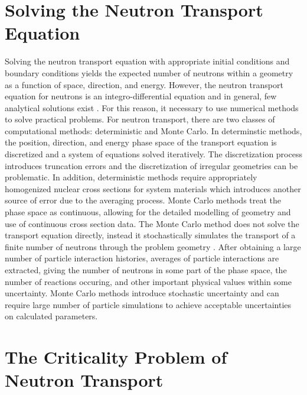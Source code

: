 \section{Solving the Neutron Transport Equation}

Solving the neutron transport equation with appropriate initial conditions and boundary conditions yields the expected number of neutrons within a geometry as a function of space, direction, and energy. However, the neutron transport equation for neutrons is an integro-differential equation and in general, few analytical solutions exist \cite{lewis_computational_1984}. For this reason, it necessary to use numerical methods to solve practical problems. For neutron transport, there are two classes of computational methods: deterministic and Monte Carlo. In determinstic methods, the position, direction, and energy phase space of the transport equation is discretized and a system of equations solved iteratively. The discretization process introduces truncation errors and the discretization of irregular geometries can be problematic. In addition, deterministic methods require appropriately homogenized nuclear cross sections for system materials which introduces another source of error due to the averaging process. Monte Carlo methods treat the phase space as continuous, allowing for the detailed modelling of geometry and use of continuous cross section data. The Monte Carlo method does not solve the transport equation directly, instead it stochastically simulates the transport of a finite number of neutrons through the problem geometry \cite{lux_monte_1991}. After obtaining a large number of particle interaction histories, averages of particle interactions are extracted, giving the number of neutrons in some part of the phase space, the number of reactions occuring, and other important physical values within some uncertainty. Monte Carlo methods introduce stochastic uncertainty and can require large number of particle simulations to achieve acceptable uncertainties on calculated parameters.

\section{The Criticality Problem of Neutron Transport}

